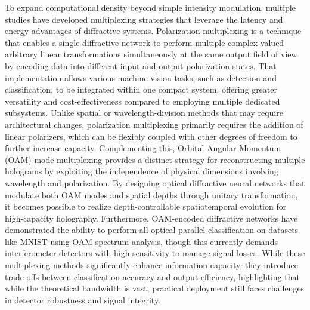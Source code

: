To expand computational density beyond simple intensity modulation, multiple studies have developed multiplexing strategies that leverage the latency and energy advantages of diffractive systems. Polarization multiplexing is a technique that enables a single diffractive network to perform multiple complex-valued arbitrary linear transformations simultaneously at the same output field of view by encoding data into different input and output polarization states. \citep{doi_10_1038_s41377_022_00849_x_e31226af} That implementation allows various machine vision tasks, such as detection and classification, to be integrated within one compact system, offering greater versatility and cost-effectiveness compared to employing multiple dedicated subsystems. Unlike spatial or wavelength-division methods that may require architectural changes, polarization multiplexing primarily requires the addition of linear polarizers, which can be flexibly coupled with other degrees of freedom to further increase capacity. Complementing this, Orbital Angular Momentum (OAM) mode multiplexing provides a distinct strategy for reconstructing multiple holograms by exploiting the independence of physical dimensions involving wavelength and polarization. By designing optical diffractive neural networks that modulate both OAM modes and spatial depths through unitary transformation, it becomes possible to realize depth-controllable spatiotemporal evolution for high-capacity holography. Furthermore, OAM-encoded diffractive networks have demonstrated the ability to perform all-optical parallel classification on datasets like MNIST using OAM spectrum analysis, though this currently demands interferometer detectors with high sensitivity to manage signal losses. While these multiplexing methods significantly enhance information capacity, they introduce trade-offs between classification accuracy and output efficiency, highlighting that while the theoretical bandwidth is vast, practical deployment still faces challenges in detector robustness and signal integrity. \citep{doi_10_1038_s41377_022_00849_x_e31226af} \citep{doi_10_1364_oe_447337_61ffab71} \citep{doi_10_1117_1_apn_2_6_066006_d88755f0}

